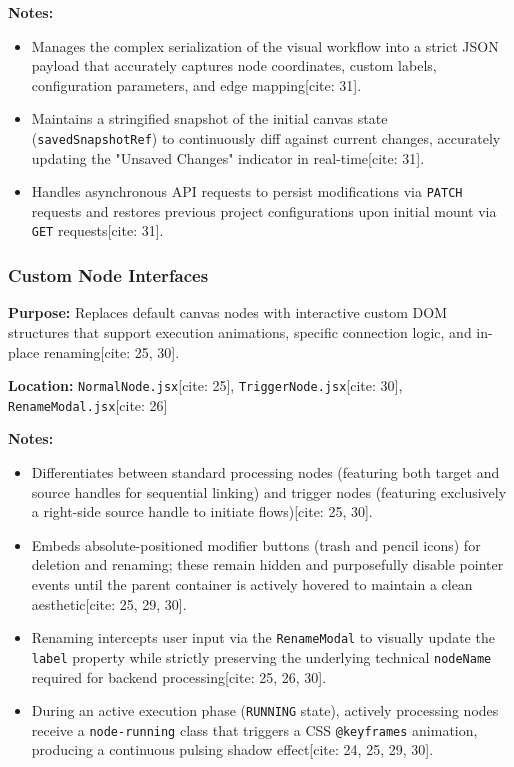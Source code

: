 \vspace{0.2cm}
\noindent\textbf{Notes:}
\begin{itemize}
    \item Manages the complex serialization of the visual workflow into a strict JSON payload that accurately captures node coordinates, custom labels, configuration parameters, and edge mapping[cite: 31].
    \item Maintains a stringified snapshot of the initial canvas state (\texttt{savedSnapshotRef}) to continuously diff against current changes, accurately updating the "Unsaved Changes" indicator in real-time[cite: 31].
    \item Handles asynchronous API requests to persist modifications via \texttt{PATCH} requests and restores previous project configurations upon initial mount via \texttt{GET} requests[cite: 31].
\end{itemize}

\subsubsection{Custom Node Interfaces}

\textbf{Purpose:} Replaces default canvas nodes with interactive custom DOM structures that support execution animations, specific connection logic, and in-place renaming[cite: 25, 30].

\vspace{0.2cm}
\noindent\textbf{Location:} \texttt{NormalNode.jsx}[cite: 25], \texttt{TriggerNode.jsx}[cite: 30], \texttt{RenameModal.jsx}[cite: 26]

\vspace{0.2cm}
\noindent\textbf{Notes:}
\begin{itemize}
    \item Differentiates between standard processing nodes (featuring both target and source handles for sequential linking) and trigger nodes (featuring exclusively a right-side source handle to initiate flows)[cite: 25, 30].
    \item Embeds absolute-positioned modifier buttons (trash and pencil icons) for deletion and renaming; these remain hidden and purposefully disable pointer events until the parent container is actively hovered to maintain a clean aesthetic[cite: 25, 29, 30].
    \item Renaming intercepts user input via the \texttt{RenameModal} to visually update the \texttt{label} property while strictly preserving the underlying technical \texttt{nodeName} required for backend processing[cite: 25, 26, 30].
    \item During an active execution phase (\texttt{RUNNING} state), actively processing nodes receive a \texttt{node-running} class that triggers a CSS \texttt{@keyframes} animation, producing a continuous pulsing shadow effect[cite: 24, 25, 29, 30].
\end{itemize}

